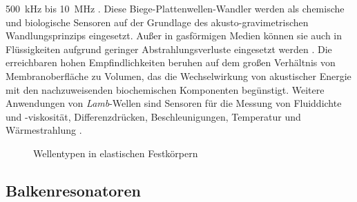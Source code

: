 500~kHz bis 10~MHz \cite{Bue91b}. Diese Biege-Plattenwellen-Wandler werden
als chemische und biologische Sensoren auf der Grundlage des
akusto-gravimetrischen Wandlungsprinzips eingesetzt. Außer in
gasförmigen Medien können sie auch in Flüssigkeiten aufgrund geringer
Abstrahlungsverluste eingesetzt werden \cite{Gie92}. Die erreichbaren
hohen Empfindlichkeiten beruhen auf dem großen Verhältnis von
Membranoberfläche zu Volumen, das die Wechselwirkung von akustischer
Energie mit den nachzuweisenden biochemischen Komponenten begünstigt.
Weitere Anwendungen von {\sl Lamb}-Wellen sind Sensoren für die Messung von
Fluiddichte und -viskosität, Differenzdrücken, Beschleunigungen, Temperatur
und Wärmestrahlung \cite{Whi87, Wen88}.
\begin{figure}[htb]
\begin{center}

\setabbzf
\end{center}
\caption{\label{abbwellentypen}
 Wellentypen in elastischen Festkörpern}
\end{figure}

\clearpage

\subsection{Balkenresonatoren}
\label{balkenreson}

